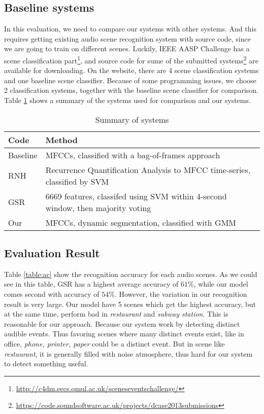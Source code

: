 \subsection{Baseline systems}
In this evaluation, we need to compare our systems with other systems. 
And this requires getting existing audio scene recognition system with source code, since we are going to train on different scenes. 
Luckily, IEEE AASP Challenge has a scene classification part\footnote{\url{http://c4dm.eecs.qmul.ac.uk/sceneseventschallenge/}}, and source code for sume of the submitted systems\footnote{\url{https://code.soundsoftware.ac.uk/projects/dcase2013submissions}} are available for downloading. 
On the website, there are 4 scene classification systems and one baseline scene classifier. 
Because of some programming issues, we choose 2 classification systems, together with the baseline scene classifier for comparison. 
Table \ref{table:systems} shows a summary of the systems used for comparison and our systems. 

\begin{table}[htb!]
\caption{Summary of systems}
\begin{tabular}{ll}
\toprule
 Code & Method \\
\bottomrule
 Baseline & MFCCs, classified with a bag-of-frames approach \\ 
 RNH & Recurrence Quantification Analysis to MFCC time-series, classified by SVM \\ 
 GSR & 6669 features, classifed using SVM within 4-second window, then majority voting \\
 Our & MFCCs, dynamic segmentation, classified with GMM \\ 
\bottomrule
\end{tabular}
\label{table:systems}
\end{table}

\subsection{Evaluation Result}
Table \ref{table:ac} show the recognition accuracy for each audio scenes. 
As we could see in this table, GSR has a highest average accuracy of $61\%$, while our model comes second with accuracy of $54\%$. 
However, the variation in our recognition result is very large. 
Our model have 5 scenes which get the highest accuracy, but at the same time, perform bad in \textit{restaurant} and \textit{subway station}. 
This is reasonable for our approach. 
Because our system work by detecting distinct audible events. 
Thus favoring scenes where many distinct events exist, like in office, \textit{phone, printer, paper} could be a distinct event. 
But in scene like \textit{restaurant}, it is generally filled with noise atmosphere, thus hard for our system to detect something useful. 

